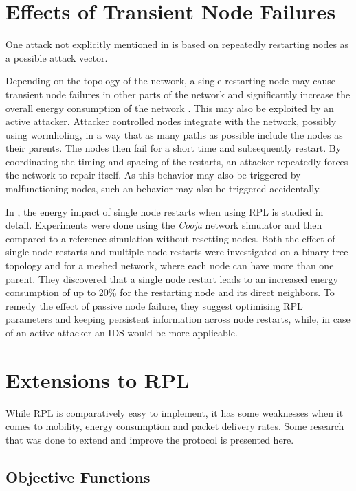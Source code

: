 \section{Effects of Transient Node Failures}

One attack not explicitly mentioned in \cite{karlof2003secure} is based on repeatedly restarting nodes as a possible attack vector.

Depending on the topology of the network, a single restarting node may cause transient node failures in other parts of the network and significantly increase the overall energy consumption of the network \cite{kulau2017energy}.
This may also be exploited by an active attacker.
Attacker controlled nodes integrate with the network, possibly using wormholing, in a way that as many paths as possible include the nodes as their parents.
The nodes then fail for a short time and subsequently restart.
By coordinating the timing and spacing of the restarts, an attacker repeatedly forces the network to repair itself.
As this behavior may also be triggered by malfunctioning nodes, such an behavior
may also be triggered accidentally.

In \cite{kulau2017energy}, the energy impact of single node restarts when using \ac{RPL} is studied in detail.
Experiments were done using the \emph{Cooja} network simulator and then compared to a reference simulation without resetting nodes.
Both the effect of single node restarts and multiple node restarts were investigated on a binary tree topology and for a meshed network, where each node can have more than one parent.
They discovered that a single node restart leads to an increased energy consumption of up to 20\% for the restarting node and its direct neighbors.
To remedy the effect of passive node failure, they suggest optimising \ac{RPL} parameters and keeping persistent information across node restarts, while, in case of an active attacker an \ac{IDS} would be more applicable.

\section{Extensions to RPL}

While \ac{RPL} is comparatively easy to implement, it has some weaknesses when it comes to mobility, energy consumption and packet delivery rates.
Some research that was done to extend and improve the protocol is presented here.

\subsection{Objective Functions}

